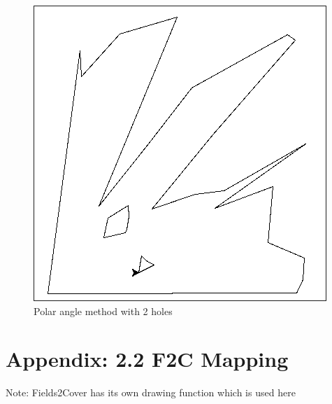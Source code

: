 \documentclass[progress]{cmpreport}
\begin{document}
\begin{appendix}
\begin{figure}[H]
		\begin{minipage}[b]{0.45\textwidth}
			\centering
			\includegraphics[width=\textwidth]{images/FirstMappingLargeHoles.jpg}
			\caption{Polar angle method with 2 holes}
		\end{minipage}
		\hfill

	\end{figure}

	\section{Appendix: 2.2 F2C Mapping}
	Note: Fields2Cover has its own drawing function which is used here


\end{appendix}
\end{document}
